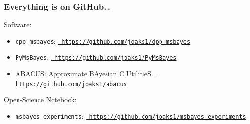 \begin{frame}
    \frametitle{Everything is on GitHub\ldots}
    Software:\\
    \begin{itemize}
        \item \texttt{dpp-msbayes}:
            \href{https://github.com/joaks1/dpp-msbayes}{\tt
            https://github.com/joaks1/dpp-msbayes}

        \item \texttt{PyMsBayes}:
            \href{https://github.com/joaks1/PyMsBayes}{\tt
            https://github.com/joaks1/PyMsBayes}

        \item ABACUS: Approximate BAyesian C UtilitieS.
            \href{https://github.com/joaks1/abacus}{\tt
            https://github.com/joaks1/abacus}
    \end{itemize}

    \medskip
    Open-Science Notebook:\\
    \begin{itemize}
        \item \texttt{msbayes-experiments}:
            \href{https://github.com/joaks1/msbayes-experiments}{\tt
            https://github.com/joaks1/msbayes-experiments}
    \end{itemize}
\end{frame}


